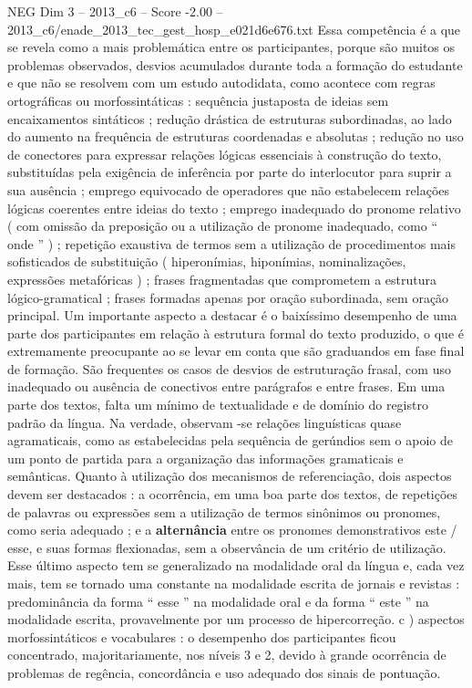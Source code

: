 \begin{textsample}{NEG Dim 3 – 2013\_c6 – Score -2.00 – 2013\_c6/enade\_2013\_tec\_gest\_hosp\_e021d6e676.txt}
Essa competência é a que se revela como a mais problemática entre os participantes, porque são muitos os problemas observados, desvios acumulados durante toda a formação do estudante e que não se resolvem com um estudo autodidata, como acontece com regras ortográficas ou morfossintáticas : sequência justaposta de ideias sem encaixamentos sintáticos ; redução drástica de estruturas subordinadas, ao lado do aumento na frequência de estruturas coordenadas e absolutas ; redução no uso de conectores para expressar relações lógicas essenciais à construção do texto, substituídas pela exigência de inferência por parte do interlocutor para suprir a sua ausência ; emprego equivocado de operadores que não estabelecem relações lógicas coerentes entre ideias do texto ; emprego inadequado do pronome relativo ( com omissão da preposição ou a utilização de pronome inadequado, como “ onde ” ) ; repetição exaustiva de termos sem a utilização de procedimentos mais sofisticados de substituição ( hiperonímias, hiponímias, nominalizações, expressões metafóricas ) ; frases fragmentadas que comprometem a estrutura lógico-gramatical ; frases formadas apenas por oração subordinada, sem oração principal.
Um importante aspecto a destacar é o baixíssimo desempenho de uma parte dos participantes em relação à estrutura formal do texto produzido, o que é extremamente preocupante ao se levar em conta que são graduandos em fase final de formação.
São frequentes os casos de desvios de estruturação frasal, com uso inadequado ou ausência de conectivos entre parágrafos e entre frases.
Em uma parte dos textos, falta um mínimo de textualidade e de domínio do registro padrão da língua.
Na verdade, observam -se relações linguísticas quase agramaticais, como as estabelecidas pela sequência de gerúndios sem o apoio de um ponto de partida para a organização das informações gramaticais e semânticas.
Quanto à utilização dos mecanismos de referenciação, dois aspectos devem ser destacados : a ocorrência, em uma boa parte dos textos, de repetições de palavras ou expressões sem a utilização de termos sinônimos ou pronomes, como seria adequado ; e a \textbf{alternância} entre os pronomes demonstrativos este / esse, e suas formas flexionadas, sem a observância de um critério de utilização.
Esse último aspecto tem se generalizado na modalidade oral da língua e, cada vez mais, tem se tornado uma constante na modalidade escrita de jornais e revistas : predominância da forma “ esse ” na modalidade oral e da forma “ este ” na modalidade escrita, provavelmente por um processo de hipercorreção. c ) aspectos morfossintáticos e vocabulares : o desempenho dos participantes ficou concentrado, majoritariamente, nos níveis 3 e 2, devido à grande ocorrência de problemas de regência, concordância e uso adequado dos sinais de pontuação.

\end{textsample}
